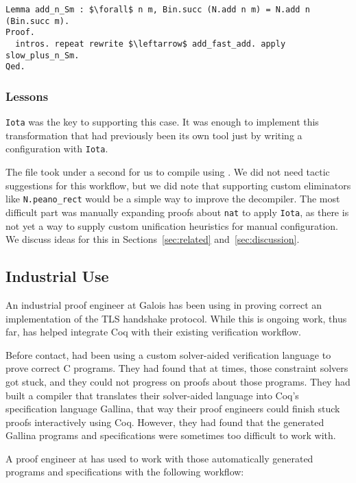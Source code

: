 \begin{lstlisting}
Lemma add_n_Sm : $\forall$ n m, Bin.succ (N.add n m) = N.add n (Bin.succ m).
Proof.
  intros. repeat rewrite $\leftarrow$ add_fast_add. apply slow_plus_n_Sm.
Qed.
\end{lstlisting}

\subsubsection{Lessons}

\lstinline{Iota} was the key to supporting this case.
It was enough to implement this transformation that had previously been its own tool
just by writing a configuration with \lstinline{Iota}. 

The file took under a second for us to compile using \toolname.
We did not need tactic suggestions for this workflow,
but we did note that supporting custom eliminators like \lstinline{N.peano_rect} would be a simple way
to improve the decompiler.
The most difficult part was manually expanding proofs about \lstinline{nat}
to apply \lstinline{Iota},
as there is not yet a way to supply custom unification heuristics for manual configuration.
We discuss ideas for this in Sections~\ref{sec:related} and~\ref{sec:discussion}.

\subsection{Industrial Use}
\label{sec:industry}

An industrial proof engineer at Galois has been using \toolname in proving
correct an implementation of the TLS handshake protocol.
While this is ongoing work, thus far,
\toolname has helped \company integrate Coq with their existing verification workflow.

Before contact, \company had been using a custom solver-aided verification language to prove correct C programs.
They had found that at times, those constraint solvers got stuck, and they could not
progress on proofs about those programs.
They had built a compiler that translates their solver-aided language into Coq's specification language Gallina,
that way their proof engineers could finish stuck proofs interactively using Coq.
However, they had found that the generated Gallina programs and specifications were sometimes too difficult to work with.

A proof engineer at \company has used \toolname to work with those automatically generated programs and specifications
with the following workflow:

